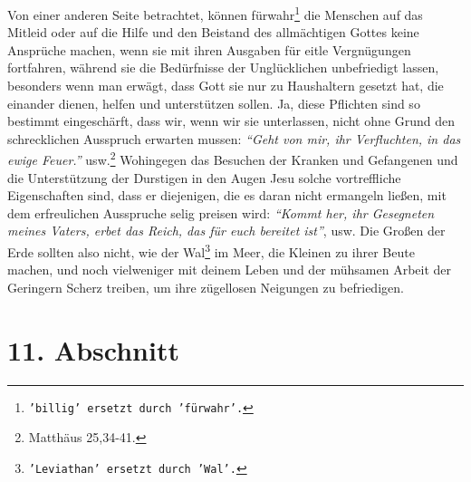 Von einer anderen Seite
betrachtet, können fürwahr\footnote{\texttt{'billig' ersetzt durch 'fürwahr'.}}
die Menschen auf das Mitleid oder auf die Hilfe und
den Beistand des allmächtigen Gottes keine Ansprüche machen, wenn sie mit ihren
Ausgaben für eitle Vergnügungen fortfahren, während sie die Bedürfnisse der
Unglücklichen unbefriedigt lassen, besonders wenn man erwägt, dass Gott sie nur
zu Haushaltern gesetzt hat, die einander dienen, helfen und unterstützen sollen.
Ja, diese Pflichten sind so bestimmt eingeschärft, dass wir, wenn wir sie
unterlassen, nicht ohne Grund den schrecklichen Ausspruch erwarten mussen:
\textit{"`Geht von mir, ihr Verfluchten, in das ewige
Feuer."'} usw.\footnote{Matthäus 25,34-41.}
Wohingegen das Besuchen der Kranken und Gefangenen und die
Unterstützung der Durstigen in den Augen Jesu solche vortreffliche Eigenschaften
sind, dass er diejenigen, die es daran nicht ermangeln ließen, mit dem
erfreulichen Ausspruche selig preisen wird:
\textit{"`Kommt her, ihr Gesegneten meines
Vaters, erbet das Reich, das für euch bereitet ist"'}, usw. Die Großen der
Erde sollten also nicht, wie der Wal\footnote{\texttt{'Leviathan' ersetzt durch
'Wal'.}} im Meer, die Kleinen zu ihrer Beute
machen, und noch vielweniger mit deinem Leben und der mühsamen Arbeit der
Geringern Scherz treiben, um ihre zügellosen Neigungen zu befriedigen.

\section{11. Abschnitt} \label{kap18_ab11}

